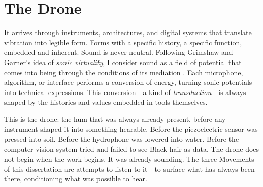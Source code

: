 %

\section*{The Drone}

It arrives through instruments, architectures, and digital systems that translate vibration into legible form. Forms with a specific history, a specific function, embedded and inherent. Sound is never neutral. Following Grimshaw and Garner's idea of \textit{sonic virtuality}, I consider sound as a field of potential that comes into being through the conditions of its mediation \parencite{Grimshaw_Garner_2015}. Each microphone, algorithm, or interface performs a conversion of energy, turning sonic potentials into technical expressions. This conversion---a kind of \textit{transduction}---is always shaped by the histories and values embedded in tools themselves.

This is the drone: the hum that was always already present, before any instrument shaped it into something hearable. Before the piezoelectric sensor was pressed into soil. Before the hydrophone was lowered into water. Before the computer vision system tried and failed to see Black hair as data. The drone does not begin when the work begins. It was already sounding. The three Movements of this dissertation are attempts to listen to it---to surface what has always been there, conditioning what was possible to hear.

